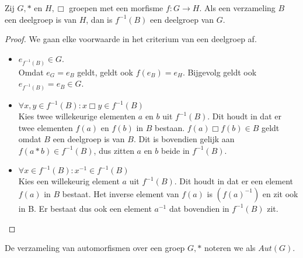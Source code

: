 \documentclass[main.tex]{subfiles}
\begin{document}
\begin{st}
  \label{st:fbm-deelgroep-g}
  Zij $G,*$ en $H,\Box$ groepen met een morfisme $f: G \rightarrow H$.
  Als een verzameling $B$ een deelgroep is van $H$, dan is $f^{-1}(B)$ een deelgroep van $G$.

  \begin{proof}
    We gaan elke voorwaarde in het criterium van een deelgroep af.
    \begin{itemize}
    \item $e_{f^{-1}(B)} \in G$.\\
      Omdat $e_{G} = e_{B}$ geldt, geldt ook $f(e_{B}) = e_{H}$.
      Bijgevolg geldt ook $e_{f^{-1}(B)} = e_{B} \in G$. 
    \item $\forall x,y \in f^{-1}(B): x \Box y \in f^{-1}(B) $\\
      Kies twee willekeurige elementen $a$ en $b$ uit $f^{-1}(B)$.
      Dit houdt in dat er twee elementen $f(a)$ en $f(b)$ in $B$ bestaan.
      $f(a) \Box f(b) \in B$ geldt omdat $B$ een deelgroep is van $B$. 
      Dit is bovendien gelijk aan $f(a * b) \in f^{-1}(B)$, dus zitten $a$ en $b$ beide in $f^{-1}(B)$.
    \item $\forall x \in f^{-1}(B): x^{-1} \in f^{-1}(B)$\\
      Kies een willekeurig element $a$ uit $f^{-1}(B)$.
      Dit houdt in dat er een element $f(a)$ in $B$ bestaat.
      Het inverse element van $f(a)$ is $(f(a)^{-1})$ en zit ook in B.
      Er bestaat dus ook een element $a^{-1}$ dat bovendien in $f^{-1}(B)$ zit.
    \end{itemize}
  \end{proof}
\end{st}

\begin{de}
  De verzameling van automorfismen over een groep $G,*$ noteren we als $Aut(G)$.
\end{de}
\end{document}
